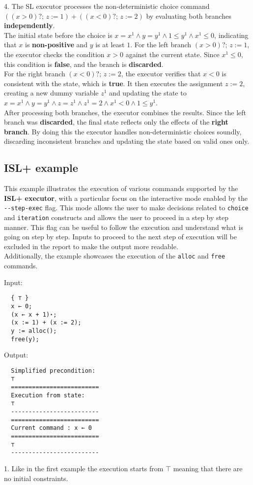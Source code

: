 \documentclass[parskip=half]{scrartcl}
\begin{document}
4. The SL executor processes the non-deterministic choice command $((x > 0)?;\, z := 1) + ((x < 0)?;\, z := 2)$ by evaluating both branches \textbf{independently}. \\The initial state before the choice is $x = x^1 ∧ y = y^1 ∧ 1 \leq y^1 ∧ x^1 \leq 0$, indicating that $x$ is \textbf{non-positive} and $y$ is at least $1$. For the left branch $(x > 0)?;\, z := 1$, the executor checks the condition $x > 0$ against the current state. Since $x^1 \leq 0$, this condition is \textbf{false}, and the branch is \textbf{discarded}. 
\\For the right branch $(x < 0)?;\, z := 2$, the executor verifies that $x < 0$ is consistent with the state, which is \textbf{true}. It then executes the assignment $z := 2$, creating a new dummy variable $z^1$ and updating the state to $x = x^1 ∧ y = y^1 ∧ z = z^1 ∧ z^1 = 2 ∧ x^1 < 0 ∧ 1 \leq y^1$. 
\\After processing both branches, the executor combines the results. Since the left branch was \textbf{discarded}, the final state reflects only the effects of the \textbf{right branch}. By doing this the executor handles non-deterministic choices soundly, discarding inconsistent branches and updating the state based on valid ones only.

\subsection{ISL+ example}
This example illustrates the execution of various commands supported by the \textbf{ISL+ executor}, with a particular focus on the interactive mode enabled by the \verb|--step-exec| flag. This mode allows the user to make decisions related to \texttt{choice} and \texttt{iteration} constructs and allows the user to proceed in a step by step manner. This flag can be useful to follow the execution and understand what is going on step by step. Inputs to proceed to the next step of execution will be excluded in the report to make the output more readable.
\\ Additionally, the example showcases the execution of the \texttt{alloc} and \texttt{free} commands.

Input: 
\begin{verbatim}
  { ⊤ }
  x ← 0;
  (x ← x + 1)⋆;
  (x := 1) + (x := 2);
  y := alloc();
  free(y);
\end{verbatim}

Output: 
\begin{verbatim}
  Simplified precondition:              
  ⊤
  =========================
  Execution from state:
  ⊤
  -------------------------
  =========================
  Current command : x ← 0
  =========================
  ⊤
  -------------------------
\end{verbatim}
1. Like in the first example the execution starts from $\top$ meaning that there are no
initial constraints.
\end{document}
